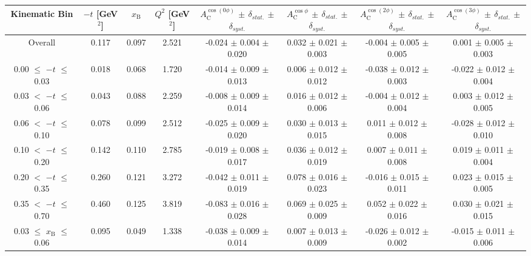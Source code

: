 \begin{table}[width=15cm]
 \begin{center}
\resizebox{16cm}{!} {
  \begin{tabular}{|c|c|c|c|c|c|c|c|}
\hline
Kinematic Bin &  $-t$ [GeV$^{2}$] & $x_{\textrm{B}}$ & $Q^{2}$ [GeV$^{2}$] & 
$A_{\textrm{C}}^{\cos(0\phi)}$ $\pm$ $\delta_{stat.}$ $\pm$ $\delta_{syst.}$ & $A_{\textrm{C}}^{\cos \phi}$ $\pm$ $\delta_{stat.}$ $\pm$ $\delta_{syst.}$
& $A_{\textrm{C}}^{\cos(2\phi)}$ $\pm$ $\delta_{stat.}$ $\pm$ $\delta_{syst.}$ & $A_{\textrm{C}}^{\cos(3\phi)}$ $\pm$ $\delta_{stat.}$ $\pm$ $\delta_{syst.}$ \\
\hline
\hline
Overall &  0.117 & 0.097 &  2.521 &  -0.024 $\pm$  0.004 $\pm$  0.020 & 
0.032  $\pm$  0.021 $\pm$   0.003 &  -0.004  $\pm$  0.005  $\pm$   0.005 &  0.001  $\pm$   0.005   $\pm$   0.003 \\
\hline
0.00 $\leqslant$ $-t$ $\leqslant$ 0.03 &  0.018 & 0.068 &  1.720 &  -0.014  $\pm$  0.009 $\pm$ 0.013 & 
0.006  $\pm$  0.012  $\pm$   0.012 &  -0.038  $\pm$  0.012 $\pm$  0.003 &  -0.022   $\pm$  0.012   $\pm$   0.004\\
0.03 $<$ $-t$ $\leqslant$ 0.06 &  0.043 & 0.088 &  2.259& -0.008  $\pm$  0.009  $\pm$   0.014 &
0.016 $\pm$  0.012  $\pm$   0.006 &  -0.004  $\pm$  0.012  $\pm$  0.004 &  0.003   $\pm$  0.012   $\pm$   0.005\\
0.06 $<$ $-t$ $\leqslant$ 0.10 &  0.078 & 0.099 &  2.512 & -0.025  $\pm$  0.009  $\pm$  0.020 & 
0.030 $\pm$  0.013  $\pm$   0.015 & 0.011  $\pm$  0.012 $\pm$   0.008 &  -0.028   $\pm$  0.012  $\pm$    0.010\\
0.10 $<$ $-t$ $\leqslant$ 0.20 &  0.142 & 0.110 &  2.785 &  -0.019  $\pm$  0.008   $\pm$  0.017 & 
0.036 $\pm$  0.012  $\pm$   0.019 &  0.007  $\pm$  0.011  $\pm$  0.008 & 0.019   $\pm$  0.011    $\pm$  0.004\\
0.20 $<$ $-t$ $\leqslant$ 0.35 &  0.260 & 0.121 &  3.272 &  -0.042 $\pm$   0.011  $\pm$  0.019 &
0.078 $\pm$  0.016  $\pm$ 0.023 & -0.016 $\pm$   0.015  $\pm$  0.011 & 0.023  $\pm$   0.015   $\pm$   0.005\\
0.35 $<$ $-t$ $\leqslant$ 0.70 &  0.460 & 0.125 &  3.819 &  -0.083  $\pm$  0.016  $\pm$   0.028 & 
0.069 $\pm$  0.025  $\pm$   0.009 & 0.052 $\pm$   0.022  $\pm$  0.016 & 0.030   $\pm$  0.021   $\pm$ 0.015\\
\hline
0.03 $\leqslant$ $x_{\textrm{B}}$ $\leqslant$ 0.06 &  0.095 & 0.049 &  1.338 &  -0.038  $\pm$  0.009  $\pm$   0.014 & 
 0.007  $\pm$  0.013  $\pm$   0.009 & -0.026 $\pm$  0.012 $\pm$   0.002 &  -0.015   $\pm$  0.011  $\pm$    0.006\\

\end{tabular}}
\end{center}
\end{table}
